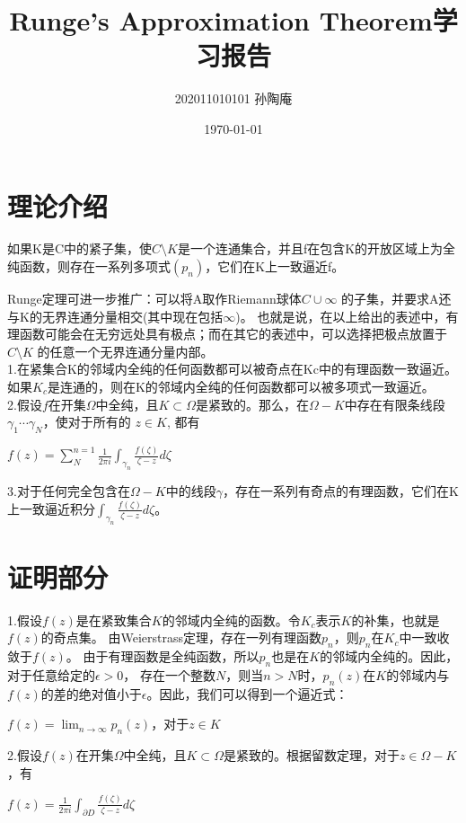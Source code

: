 \documentclass[12pt, a4paper, oneside]{article}
\title{Runge's Approximation Theorem学习报告}
\date{\today}
\author{202011010101 孙陶庵}
\begin{document}
\begin{spacing}{2.0}
\maketitle

\section{理论介绍}
如果K是C中的紧子集，使$C\setminus K$是一个连通集合，并且f在包含K的开放区域上为全纯函数，则存在一系列多项式$(p_{n})$，它们在K上一致逼近f。\cite{stein2010complex}

Runge定理可进一步推广：可以将A取作Riemann球体$C\cup{\infty}$ 的子集，并要求A还与K的无界连通分量相交(其中现在包括$\infty$)。
也就是说，在以上给出的表述中，有理函数可能会在无穷远处具有极点；而在其它的表述中，可以选择把极点放置于$C\setminus K$ 的任意一个无界连通分量内部。\\

1.在紧集合K的邻域内全纯的任何函数都可以被奇点在Kc中的有理函数一致逼近。如果$K_c$是连通的，则在K的邻域内全纯的任何函数都可以被多项式一致逼近。\\
2.假设$f$在开集$\Omega$中全纯，且$K \subset  \Omega$是紧致的。那么，在$\Omega - K$中存在有限条线段$\gamma_1\cdots\gamma_N$，使对于所有的 $z\in K$, 都有

\begin{center}
    $f(z) = \displaystyle\sum_{N}^{n = 1}\frac{1}{2\pi i}\displaystyle\int_{\gamma_n}\frac{f(\zeta)}{\zeta - z}d\zeta$
\end{center}
3.对于任何完全包含在$\Omega-K$中的线段$\gamma$，存在一系列有奇点的有理函数，它们在K上一致逼近积分$\displaystyle\int_{\gamma_n}\frac{f(\zeta)}{\zeta - z}d\zeta$。
\section{证明部分}
1.假设$f(z)$是在紧致集合$K$的邻域内全纯的函数。令$K_c$表示$K$的补集，也就是$f(z)$的奇点集。
由Weierstrass定理，存在一列有理函数${p_n}$，则$p_n$在$K_c$中一致收敛于$f(z)$。
由于有理函数是全纯函数，所以$p_n$也是在$K$的邻域内全纯的。因此，对于任意给定的$\epsilon > 0$，
存在一个整数$N$，则当$n > N$时，$p_n(z)$在$K$的邻域内与$f(z)$的差的绝对值小于$\epsilon$。因此，我们可以得到一个逼近式：
\begin{center}
    $f(z) = \displaystyle\lim_{n \to \infty}p_n(z)$，对于$z\in K$
\end{center}

    
2.假设$f(z)$在开集$\Omega$中全纯，且$K \subset \Omega$是紧致的。根据留数定理，对于$z\in \Omega - K$，有\cite{fornaess2020holomorphic}
\begin{center}
$f(z) = \displaystyle\frac{1}{2\pi i}\int_{\partial D} \frac{f(\zeta)}{\zeta - z} d\zeta$
\end{center}


\end{spacing}
\end{document}
